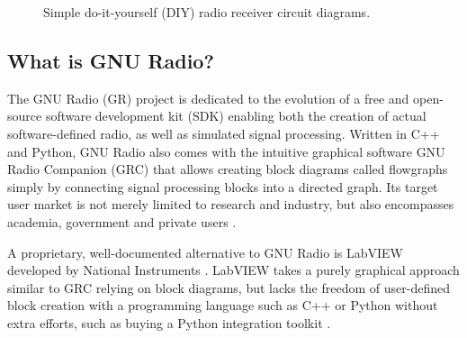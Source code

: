 \begin{figure}[tb]
	\label{fig:radio-receiver-circuits}
	\begin{center}
		\qquad
	\end{center}
	\caption{Simple do-it-yourself (DIY) radio receiver circuit diagrams.}
\end{figure}

\subsection{What is GNU Radio?}

\label{sec:gnu-radio}

The GNU Radio (GR) project is dedicated to the evolution of a free and open-source software development kit (SDK) enabling both the creation of actual software-defined radio, as well as simulated signal processing. Written in C++ and Python, GNU Radio also comes with the intuitive graphical software GNU Radio Companion (GRC) that allows creating block diagrams called flowgraphs simply by connecting signal processing blocks into a directed graph. Its target user market is not merely limited to research and industry, but also encompasses academia, government and private users \cite{gnuradio-about}.

A proprietary, well-documented alternative to GNU Radio is LabVIEW developed by National Instruments \cite{labview-about}. LabVIEW takes a purely graphical approach similar to GRC relying on block diagrams, but lacks the freedom of user-defined block creation with a programming language such as C++ or Python without extra efforts, such as buying a Python integration toolkit \cite{labview-python}.

